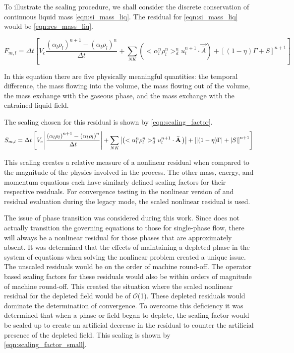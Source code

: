 To illustrate the scaling procedure, we shall consider the discrete conservation of continuous liquid mass \eqref{eqn:si_mass_liq}.
The residual for \eqref{eqn:si_mass_liq} would be \eqref{eqn:res_mass_liq}.

\begin{equation}
\label{eqn:res_mass_liq}
F_{m,l} = \Delta t \left[ V_c \frac{\left(\alpha_l \rho_l \right)^{n+1} - \left(\alpha_l \rho_l \right)^{n}}{\Delta t} + \sum_{NK}\left( <\alpha^n_l \rho^n_l>^{n}_{d} u^{n+1}_l  \cdot \vec{\bar{A}}\right) + \left[(1-\eta)\Gamma + S \right]^{n+1}\right]
\end{equation}

In this equation there are five physically meaningful quantities: the temporal difference, the mass flowing into  the volume, the mass flowing out of the volume, the mass exchange with the gaseous phase, and the mass exchange with the entrained liquid field.

The scaling chosen for this residual is shown by \eqref{eqn:scaling_factor}.
\begin{equation}
\label{eqn:scaling_factor}
S_{m,l} = \Delta t \left[ V_c \abs{\frac{\left(\alpha_l \rho_l \right)^{n+1} - \left(\alpha_l \rho_l \right)^{n}}{\Delta t}} + \sum_{NK}\abs{\left( <\alpha^n_l \rho^n_l>^{n}_{d} u^{n+1}_l  \cdot \vec{\bar{A}}\right)} + \left[\abs{(1-\eta)\Gamma} + \abs{S} \right]^{n+1}\right]
\end{equation}

This scaling creates a relative measure of a nonlinear residual when compared to the magnitude of the physics involved in the process.
The other mass, energy, and momentum equations each have similarly defined scaling factors for their respective residuals.
For convergence testing in the nonlinear version of \cobra{} and residual evaluation during the legacy mode, the scaled nonlinear residual is used.

The issue of phase transition was considered during this work.
Since \cobra{} does not actually transition the governing equations to those for single-phase flow, there will always be a nonlinear residual for those phases that are approximately absent.
It was determined that the effects of maintaining a depleted phase in the system of equations when solving the nonlinear problem created a unique issue.
The unscaled residuals would be on the order of machine round-off.
The operator based scaling factors for these residuals would also be within orders of magnitude of machine round-off.
This created the situation where the scaled nonlinear residual for the depleted field would be of $\mathcal{O}$(1).
These depleted residuals would dominate the determination of convergence.
To overcome this deficiency it was determined that when a phase or field began to deplete, the scaling factor would be scaled up to create an artificial decrease in the residual to counter the artificial presence of the depleted field.
This scaling is shown by \eqref{eqn:scaling_factor_small}.

